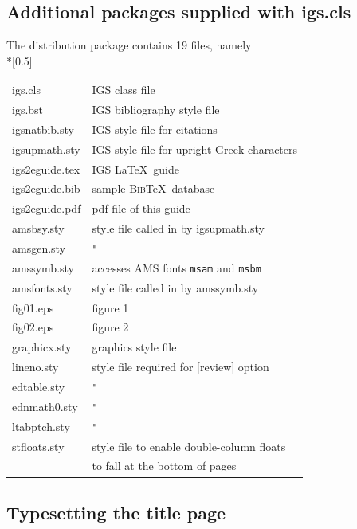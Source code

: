 \documentclass[twocolumn]{igs}
\begin{document}
\subsection{Additional packages supplied with igs.cls}
The distribution package contains 19 files, namely\\*[0.5\baselineskip]
\begin{tabular}{@{}ll}
igs.cls & IGS class file\\
igs.bst & IGS bibliography style file\\
igsnatbib.sty & IGS style file for citations\\
igsupmath.sty & IGS style file for upright Greek characters\\
igs2eguide.tex & IGS \LaTeX\ guide\\
igs2eguide.bib & sample \textsc{Bib}\TeX\ database\\
igs2eguide.pdf & pdf file of this guide\\
amsbsy.sty & style file called in by igsupmath.sty\\
amsgen.sty & \hskip 65pt\texttt{"}\\
amssymb.sty & accesses AMS fonts \verb"msam" and \verb"msbm"\\
amsfonts.sty & style file called in by amssymb.sty\\
fig01.eps & figure 1\\
fig02.eps & figure 2\\
graphicx.sty & graphics style file\\
lineno.sty & style file required for [review] option\\
edtable.sty & \hskip 65pt\texttt{"}\\
ednmath0.sty & \hskip 65pt\texttt{"}\\
ltabptch.sty & \hskip 65pt\texttt{"}\\
stfloats.sty & style file to enable double-column floats\\
             & to fall at the bottom of pages
\end{tabular}

\subsection{Typesetting the title page}
\end{document}
